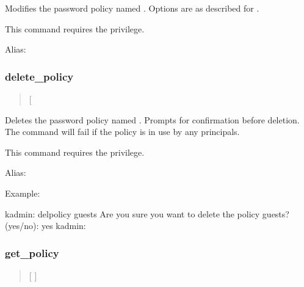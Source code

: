 \documentclass[letterpaper,10pt,english]{sphinxmanual}
\begin{document}
Modifies the password policy named .  Options are as described
for .

This command requires the  privilege.

Alias: 

\label{\detokenize{admin/admin_commands/kadmin_local:modify-policy-end}}

\subsubsection{delete\_policy}
\label{\detokenize{admin/admin_commands/kadmin_local:delete-policy}}\label{\detokenize{admin/admin_commands/kadmin_local:modify-policy-end}}\label{\detokenize{admin/admin_commands/kadmin_local:id14}}\begin{quote}

 {[}\sphinxstylestrong{-force}{]} 
\end{quote}

Deletes the password policy named .  Prompts for confirmation
before deletion.  The command will fail if the policy is in use by any
principals.

This command requires the  privilege.

Alias: 

Example:

%
\begin{sphinxVerbatim}[commandchars=\\\{\}]
kadmin: del\PYGZus{}policy guests
Are you sure you want to delete the policy \PYGZdq{}guests\PYGZdq{}?
(yes/no): yes
kadmin:
\end{sphinxVerbatim}
\label{\detokenize{admin/admin_commands/kadmin_local:delete-policy-end}}

\subsubsection{get\_policy}
\label{\detokenize{admin/admin_commands/kadmin_local:delete-policy-end}}\label{\detokenize{admin/admin_commands/kadmin_local:get-policy}}\label{\detokenize{admin/admin_commands/kadmin_local:id15}}\begin{quote}

 {[}  {]} 
\end{quote}
\end{document}
